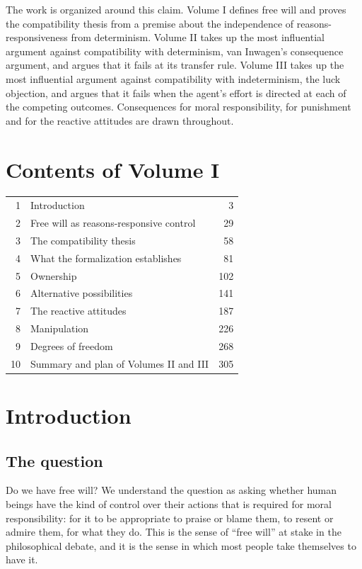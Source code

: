 \documentclass{situationist-preprint}
\begin{document}
The work is organized around this claim. Volume I defines free will and proves the compatibility thesis from a premise about the independence of reasons-responsiveness from determinism. Volume II takes up the most influential argument against compatibility with determinism, van Inwagen's consequence argument, and argues that it fails at its transfer rule. Volume III takes up the most influential argument against compatibility with indeterminism, the luck objection, and argues that it fails when the agent's effort is directed at each of the competing outcomes. Consequences for moral responsibility, for punishment and for the reactive attitudes are drawn throughout.

\section*{Contents of Volume I}

\begin{center}\small
\begin{tabular}{@{}rlr@{}}
1 & Introduction & 3 \\
2 & Free will as reasons-responsive control & 29 \\
3 & The compatibility thesis & 58 \\
4 & What the formalization establishes & 81 \\
5 & Ownership & 102 \\
6 & Alternative possibilities & 141 \\
7 & The reactive attitudes & 187 \\
8 & Manipulation & 226 \\
9 & Degrees of freedom & 268 \\
10 & Summary and plan of Volumes II and III & 305 \\
\end{tabular}
\end{center}

\section{Introduction}

\subsection{The question}

Do we have free will? We understand the question as asking whether human beings have the kind of control over their actions that is required for moral responsibility: for it to be appropriate to praise or blame them, to resent or admire them, for what they do. This is the sense of \enquote{free will} at stake in the philosophical debate, and it is the sense in which most people take themselves to have it.
\end{document}
